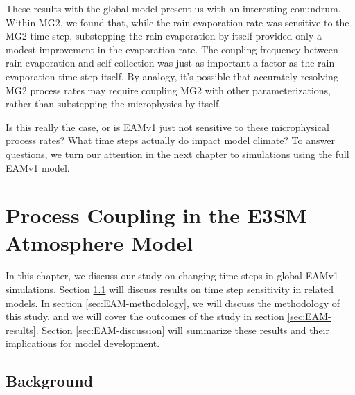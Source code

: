 \documentclass [11pt, proquest] {uwthesis}[2020/02/24]
\begin{document}
These results with the global model present us with an interesting conundrum. Within MG2, we found that, while the rain evaporation rate was sensitive to the MG2 time step, substepping the rain evaporation by itself provided only a modest improvement in the evaporation rate. The coupling frequency between rain evaporation and self-collection was just as important a factor as the rain evaporation time step itself. By analogy, it's possible that accurately resolving MG2 process rates may require coupling MG2 with other parameterizations, rather than substepping the microphysics by itself.

Is this really the case, or is EAMv1 just not sensitive to these microphysical process rates? What time steps actually do impact model climate? To answer questions, we turn our attention in the next chapter to simulations using the full EAMv1 model.

\chapter{Process Coupling in the E3SM Atmosphere Model} \label{ch:EAM}

In this chapter, we discuss our study on changing time steps in global EAMv1 simulations. Section \ref{sec:EAM-background} will discuss results on time step sensitivity in related models. In section \ref{sec:EAM-methodology}, we will discuss the methodology of this study, and we will cover the outcomes of the study in section \ref{sec:EAM-results}. Section \ref{sec:EAM-discussion} will summarize these results and their implications for model development.

\section{Background} \label{sec:EAM-background}
\end{document}
